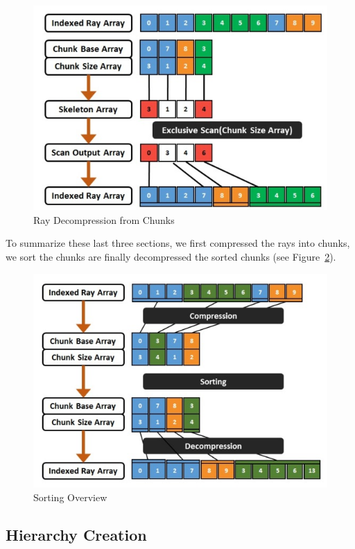 \begin{figure}[!htb]
    \centering
    \includegraphics[scale=0.75]{Images/Ray_Decompression}
    \caption{\label{fig:rd}Ray Decompression from Chunks}
\end{figure}

To summarize these last three sections, we first compressed the rays into chunks, we sort the chunks are finally decompressed the sorted chunks (see Figure~\ref{fig:so}).   

\begin{figure}[!htb]
    \centering
    \includegraphics[scale=0.90]{Images/Sorting_Overview}
    \caption{\label{fig:so}Sorting Overview}
\end{figure}

\subsection{Hierarchy Creation}

